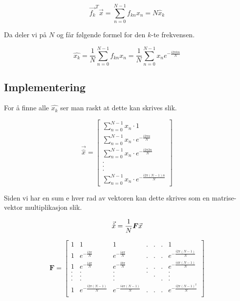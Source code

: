 \documentclass{article}
\begin{document}
            \[
                \vec{f_k}^T\vec{x} = \sum_{n = 0}^{N-1}f_{kn}x_n = N\hat{x}_k
            \]

            Da deler vi på \(N\) og får følgende formel for den \(k\)-te frekvensen.

            \[
                \hat{x_k} = \frac{1}{N}\sum_{n = 0}^{N-1}f_{kn}x_n = \frac{1}{N}\sum_{n = 0}^{N-1}x_ne^{-\frac{i2\pi kn}{N}}
            \]

    \subsection{Implementering}
        For å finne alle \(\hat{x_k}\) ser man raskt at dette kan skrives slik.

        \[
            \vec{\hat{x}} =
            \begin{bmatrix}
                \sum_{n = 0}^{N-1}x_n \cdot 1 \\ \sum_{n = 0}^{N-1}x_n \cdot e^{-\frac{i2\pi n}{N}} \\ \sum_{n = 0}^{N-1}x_n \cdot e^{-\frac{i2\pi 2n}{N}} \\ . \\ . \\ . \\ \sum_{n = 0}^{N-1}x_n \cdot e^{-\frac{i2\pi (N-1)n}{N}}
            \end{bmatrix}
        \]
        
        Siden vi har en sum e hver rad av vektoren kan dette skrives som en matrise-vektor multiplikasjon slik.
        
        \[
            \vec{\hat{x}} = \frac{1}{N}\boldsymbol{F}\vec{x} \\
        \]
        
        \[
            \boldsymbol{F} = 
            \begin{bmatrix}
            1 &       1                     &        1                  & . & . & . & 1                       \\ 
            1 & e^{-\frac{i2\pi}{N}}    & e^{-\frac{i4\pi}{N}}    & . & . & . & e^{-\frac{i2\pi (N-1)}{N}}    \\ 
            1 & e^{-\frac{i4\pi}{N}}    & e^{-\frac{i8\pi}{N}}    & . & . & . & e^{-\frac{i4\pi (N-1)}{N}}    \\ 
            . &       .                 &         .               & . &   &   & .                             \\ 
            . &       .                 &         .               &   & . &   & .                             \\
            . &       .                 &         .               &   &   & . & .                             \\
            1 & e^{-\frac{i2\pi (N-1)}{N}} & e^{-\frac{i4\pi (N-1)}{N}}                       & . & . & . & e^{-\frac{i2\pi(N-1)^2}{N}}                            \\
            \end{bmatrix}
        \]
\end{document}
